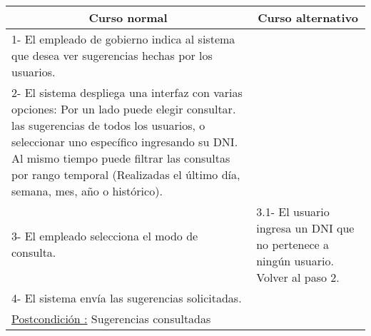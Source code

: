 ~


\begin{center}
    \centering
    \begin{tabular}{ | p{11cm} | p{6cm} | }
    	\multicolumn{1}{c}{\cellcolor{black!30}\textbf{Curso normal}} & 
    	\multicolumn{1}{c}{\cellcolor{black!30}\textbf{Curso alternativo}} \\ \hline
    	1- El empleado de gobierno indica al sistema que desea ver sugerencias hechas por los usuarios. & \\ \hline
    	2- El sistema despliega una interfaz con varias opciones: Por un lado puede elegir consultar. 
    	las sugerencias de todos los usuarios, o seleccionar uno específico ingresando su DNI. Al mismo
    	tiempo puede filtrar las consultas por rango temporal (Realizadas el último día, semana, mes, año
    	o histórico). & \\ \hline
    	3- El empleado selecciona el modo de consulta. & 3.1- El usuario ingresa un DNI que no pertenece a ningún usuario. Volver al paso 2. \\ \hline
    	4- El sistema envía las sugerencias solicitadas. & \\ \hline
		\underline{Postcondición :} Sugerencias consultadas & \\ \hline
    \end{tabular}
\end{center}


